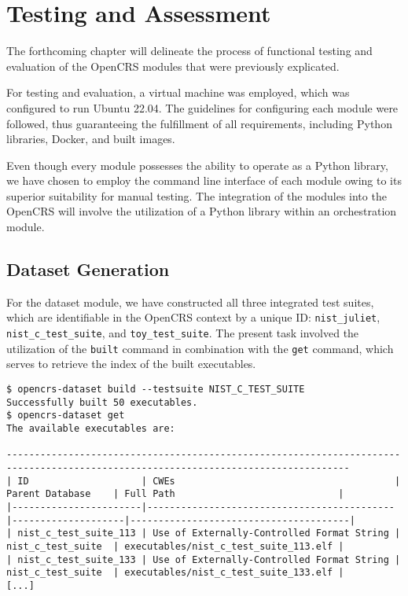 \documentclass[../main.tex]{subfiles}
\begin{document}
\hypertarget{testing-and-assesment}{%
  \chapter{Testing and Assessment}\label{testing-and-assesment}}

The forthcoming chapter will delineate the process of functional testing and
evaluation of the OpenCRS modules that were previously explicated.

For testing and evaluation, a virtual machine was employed, which was
configured to run Ubuntu 22.04. The guidelines for configuring each module were
followed, thus guaranteeing the fulfillment of all requirements, including
Python libraries, Docker, and built images.

Even though every module possesses the ability to operate as a Python library,
we have chosen to employ the command line interface of each module owing to its
superior suitability for manual testing. The integration of the modules into
the OpenCRS will involve the utilization of a Python library within an
orchestration module.

\hypertarget{dataset-generation}{%
  \section{Dataset Generation}\label{dataset-generation}}

For the dataset module, we have constructed all three integrated test suites,
which are identifiable in the OpenCRS context by a unique ID:
\texttt{nist\_juliet}, \texttt{nist\_c\_test\_suite}, and
\texttt{toy\_test\_suite}. The present task involved the utilization of the
\texttt{built} command in combination with the \texttt{get} command, which
serves to retrieve the index of the built executables.

\begin{tiny}
\begin{verbatim}
$ opencrs-dataset build --testsuite NIST_C_TEST_SUITE
Successfully built 50 executables.
$ opencrs-dataset get
The available executables are:

-----------------------------------------------------------------------------------------------------------------------------------
| ID                    | CWEs                                       | Parent Database    | Full Path                             |
|-----------------------|--------------------------------------------|--------------------|---------------------------------------|
| nist_c_test_suite_113 | Use of Externally-Controlled Format String | nist_c_test_suite  | executables/nist_c_test_suite_113.elf |
| nist_c_test_suite_133 | Use of Externally-Controlled Format String | nist_c_test_suite  | executables/nist_c_test_suite_133.elf |
[...]
\end{verbatim}
\end{tiny}
\end{document}
